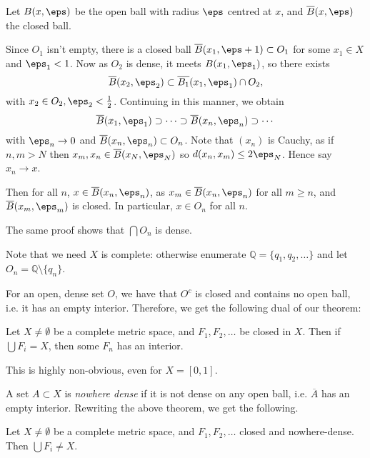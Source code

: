 \documentclass[12pt]{article}
\begin{document}
\begin{proofbox}
	Let $B(x, \eps)$ be the open ball with radius $\eps$ centred at $x$, and $\overline{B}(x,\eps)$ the closed ball.

	Since $O_1$ isn't empty, there is a closed ball $\overline{B}(x_1, \eps+1) \subset O_1$ for some $x_1 \in X$ and $\eps_1 < 1$. Now as $O_2$ is dense, it meets $B(x_1, \eps_1)$, so there exists
	\[
		\overline{B}(x_2, \eps_2) \subset \overline{B_1}(x_1, \eps_1) \cap O_2,
	\]
	with $x_2 \in O_2, \eps_2 < \frac{1}{2}$. Continuing in this manner, we obtain
	\[
	\overline{B}(x_1, \eps_1) \supset \cdots \supset \overline{B}(x_n, \eps_n) \supset \cdots
	\]
	with $\eps_n \to 0$ and $\overline{B}(x_n, \eps_n) \subset O_n$. Note that $(x_n)$ is Cauchy, as if $n, m > N$ then $x_m, x_n \in \overline{B}(x_N, \eps_N)$ so $d(x_n, x_m) \leq 2 \eps_N$. Hence say $x_n \to x$.

	Then for all $n$, $x \in \overline{B}(x_n, \eps_n)$, as $x_m \in \overline{B}(x_n, \eps_n)$ for all $m \geq n$, and $\overline{B}(x_m, \eps_m)$ is closed. In particular, $x \in O_n$ for all $n$.
\end{proofbox}

\begin{remark}
	The same proof shows that $\bigcap O_n$ is dense.

	Note that we need $X$ is complete: otherwise enumerate $\mathbb{Q} = \{q_1, q_2, \ldots\}$ and let $O_n = \mathbb{Q} \setminus \{q_n\}$.
\end{remark}

For an open, dense set $O$, we have that $O^{c}$ is closed and contains no open ball, i.e. it has an empty interior. Therefore, we get the following dual of our theorem:

\begin{theorem}
	Let $X \neq \emptyset$ be a complete metric space, and $F_1, F_2, \ldots$ be closed in $X$. Then if $\bigcup F_i = X$, then some $F_n$ has an interior.
\end{theorem}

This is highly non-obvious, even for $X = [0,1]$.

A set $A \subset X$ is \emph{nowhere dense} if it is not dense on any open ball, i.e. $\overline{A}$ has an empty interior. Rewriting the above theorem, we get the following.

\begin{theorem}
	Let $X \neq \emptyset$ be a complete metric space, and $F_1, F_2,\ldots$ closed and nowhere-dense. Then $\bigcup F_i \neq X$.
\end{theorem}
\end{document}
